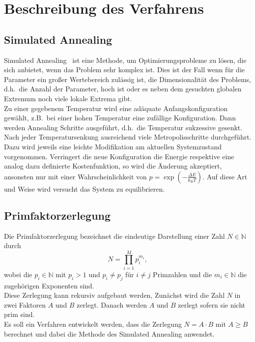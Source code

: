 \chapter{Beschreibung des Verfahrens}\label{ch:algorithm}

\section{Simulated Annealing}
Simulated Annealing~\parencite{nr} ist eine Methode, um Optimierungsprobleme zu lösen, die sich anbietet, wenn das Problem sehr komplex ist. Dies ist der Fall wenn für die Parameter ein großer Wertebereich zulässig ist, die Dimensionalität des Problems, d.h.\ die Anzahl der Parameter, hoch ist oder es neben dem gesuchten globalen Extremum noch viele lokale Extrema gibt. \\
Zu einer gegebenem Temperatur wird eine adäquate Anfangskonfiguration gewählt, z.B.\ bei einer hohen Temperatur eine zufällige Konfiguration. Dann werden Annealing Schritte ausgeführt, d.h.\ die Temperatur sukzessive gesenkt. Nach jeder Temperatursenkung ausreichend viele Metropolisschritte durchgeführt. Dazu wird jeweils eine leichte Modifikation am aktuellen Systemzustand vorgenommen. Verringert die neue Konfiguration die Energie respektive eine analog dazu definierte Kostenfunktion, so wird die Änderung akzeptiert, ansonsten nur mit einer Wahrscheinlichkeit von $p=\exp\left(-\frac{\Delta E}{k_\mathrm{B}T}\right)$. Auf diese Art und Weise wird versucht das System zu equilibrieren.

\section{Primfaktorzerlegung}
Die Primfaktorzerlegung bezeichnet die eindeutige Darstellung einer Zahl $N\in\mathbb{N}$ durch
\begin{equation*}
  N=\prod\limits_{i=1}^M p_i^{m_i},
\end{equation*}
wobei die $p_i\in\mathbb{N}$ mit $p_i>1$ und $p_i\neq p_j$ für $i\neq j$ Primzahlen und die $m_i\in\mathbb{N}$ die zugehörigen Exponenten sind.\\
Diese Zerlegung kann rekursiv aufgebaut werden, Zunächst wird die Zahl $N$ in zwei Faktoren $A$ und $B$ zerlegt. Danach werden $A$ und $B$ zerlegt sofern sie nicht prim sind.\\
Es soll ein Verfahren entwickelt werden, dass die Zerlegung $N=A\cdot B$ mit $A\geq B$ berechnet und dabei die Methode des Simulated Annealing anwendet.\\

